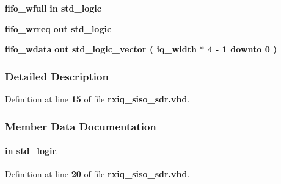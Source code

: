 \begin{DoxyCompactItemize}
\item 
{\bf fifo\+\_\+wfull}  {\bfseries {\bfseries \textcolor{keywordflow}{in}\textcolor{vhdlchar}{ }}} {\bfseries \textcolor{comment}{std\+\_\+logic}\textcolor{vhdlchar}{ }} 
\item 
{\bf fifo\+\_\+wrreq}  {\bfseries {\bfseries \textcolor{keywordflow}{out}\textcolor{vhdlchar}{ }}} {\bfseries \textcolor{comment}{std\+\_\+logic}\textcolor{vhdlchar}{ }} 
\item 
{\bf fifo\+\_\+wdata}  {\bfseries {\bfseries \textcolor{keywordflow}{out}\textcolor{vhdlchar}{ }}} {\bfseries \textcolor{comment}{std\+\_\+logic\+\_\+vector}\textcolor{vhdlchar}{ }\textcolor{vhdlchar}{(}\textcolor{vhdlchar}{ }\textcolor{vhdlchar}{ }\textcolor{vhdlchar}{ }\textcolor{vhdlchar}{ }{\bfseries {\bf iq\+\_\+width}} \textcolor{vhdlchar}{$\ast$}\textcolor{vhdlchar}{ } \textcolor{vhdldigit}{4} \textcolor{vhdlchar}{-\/}\textcolor{vhdlchar}{ } \textcolor{vhdldigit}{1} \textcolor{vhdlchar}{ }\textcolor{keywordflow}{downto}\textcolor{vhdlchar}{ }\textcolor{vhdlchar}{ } \textcolor{vhdldigit}{0} \textcolor{vhdlchar}{ }\textcolor{vhdlchar}{)}\textcolor{vhdlchar}{ }} 
\end{DoxyCompactItemize}


\subsubsection{Detailed Description}


Definition at line {\bf 15} of file {\bf rxiq\+\_\+siso\+\_\+sdr.\+vhd}.



\subsubsection{Member Data Documentation}
\paragraph[{clk}]{ {\bfseries \textcolor{keywordflow}{in}\textcolor{vhdlchar}{ }} {\bfseries \textcolor{comment}{std\+\_\+logic}\textcolor{vhdlchar}{ }} \hspace{0.3cm}{\ttfamily [Port]}}\label{classrxiq__siso__sdr_a4a4609c199d30b3adebbeb3a01276ec5}


Definition at line {\bf 20} of file {\bf rxiq\+\_\+siso\+\_\+sdr.\+vhd}.


